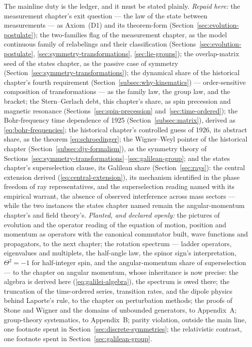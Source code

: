 The mainline duty is the ledger, and it must be stated plainly. \emph{Repaid here:} the measurement chapter's exit question --- the law of the state between measurements --- as Axiom~(D1) and its theorem-form (Section~\ref{sec:evolution-postulate}); the two-families flag of the measurement chapter, as the model continuous family of relabelings and their classification (Sections~\ref{sec:evolution-postulate}, \ref{sec:symmetry-transformations}, \ref{sec:lie-groups}); the overlap-matrix seed of the states chapter, as the passive case of symmetry (Section~\ref{sec:symmetry-transformations}); the dynamical share of the historical chapter's fourth requirement (Section~\ref{subsec:why-kinematics}) --- order-sensitive composition of transformations --- as the family law, the group law, and the bracket; the Stern--Gerlach debt, this chapter's share, as spin precession and magnetic resonance (Sections~\ref{sec:spin-precession} and~\ref{sec:time-ordered}); the Bohr-frequency time dependence of 1925 (Section~\ref{subsec:matrix}), derived as \eqref{eq:bohr-frequencies}; the historical chapter's controlled guess of 1926, its abstract share, as the theorem \eqref{eq:schroedinger}; the Wigner--Weyl pointer of the historical chapter (Section~\ref{subsec:djv-formalism}), as the symmetry theory of Sections~\ref{sec:symmetry-transformations}--\ref{sec:galilean-group}; and the states chapter's superselection clause, its Galilean share (Section~\ref{sec:rays}): the central extension derived (\eqref{eq:central-extension}), its mechanism identified in the phase freedom of ray representatives, and the superselection reading named with its empirical warrant, the absence of observed interference across mass sectors --- while the two instances the states chapter named remain the angular-momentum chapter's and field theory's. \emph{Planted, and declared openly:} the pictures of evolution and the operator reading of the equation of motion, position and momentum as operators with the canonical commutator built, wave functions and propagators, to the next chapter; the rotation spectrum --- ladder operators, eigenvalues and multiplets, the half-angle law, the spinor sign's interpretation, $\Theta^2 = -1$ for half-integer spin, and the angular-momentum share of superselection --- to the chapter on angular momentum, whose inheritance is now precise: the algebra is derived here (\eqref{eq:galilei-algebra}), the spectrum is owed there; the truncation of the time-ordered series, transition rates, and the dipole physics behind Laporte's rule, to the chapter on perturbation methods; the proofs of Stone and Wigner and the domains of unbounded generators, to Appendix~A; group-theory systematics, to Appendix~B; parity violation, outside the main line, one footnote spent in Section~\ref{sec:discrete-symmetries}; the relativistic contrast, one footnote spent in Section~\ref{sec:galilean-group}.

